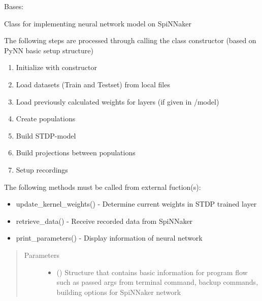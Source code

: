 \documentclass[letterpaper,10pt,english]{sphinxmanual}
\begin{document}

\begin{fulllineitems}
\label{\detokenize{SpikingConvNet:SpikingConvNet.classes.Spinnaker_Network}}
Bases: 

Class for implementing neural network model on SpiNNaker

The following steps are processed through calling the class constructor
(based on PyNN basic setup structure)
\begin{enumerate}
\item {} 
Initialize with constructor

\item {} 
Load datasets (Train and Testset) from local files

\item {} 
Load previously calculated weights for layers (if given in /model)

\item {} 
Create populations

\item {} 
Build STDP-model

\item {} 
Build projections between populations

\item {} 
Setup recordings

\end{enumerate}

The following methods must be called from external fuction(s):
\begin{itemize}
\item {} 
update\_kernel\_weights() - Determine current weights in STDP trained layer

\item {} 
retrieve\_data() - Receive recorded data from SpiNNaker

\item {} 
print\_parameters() - Display information of neural network

\end{itemize}
\begin{quote}\begin{description}
\item[{Parameters}] \leavevmode\begin{itemize}
\item {} 
 () \textendash{} Structure that contains basic information for program flow such as
passed args from terminal command, backup commands, building options
for SpiNNaker network


\end{itemize}
\end{description}
\end{quote}
\end{fulllineitems}
\end{document}
